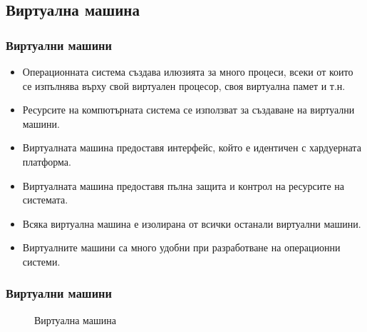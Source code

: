\documentclass[ignorenonframetext, hyperref=unicode]{beamer}
\begin{document}
\subsection{Виртуална машина}

\begin{frame}
\frametitle{Виртуални машини}
\begin{itemize}
\item Операционната система създава илюзията за много процеси, всеки от които се
изпълнява върху свой виртуален процесор, своя виртуална памет и т.н.
\item Ресурсите на компютърната система се използват за създаване на виртуални
машини.
\item Виртуалната машина предоставя интерфейс, който е идентичен с хардуерната
платформа. 
\item Виртуалната машина предоставя пълна защита и контрол на ресурсите на
системата.
\item Всяка виртуална машина е изолирана от всички останали виртуални машини.
\item Виртуалните машини са много удобни при разработване на операционни системи.
\end{itemize}
\end{frame}

\begin{frame}
\frametitle{Виртуални машини}
\begin{figure}[h]
\center
{}
\caption{Виртуална машина}
\end{figure}
\end{frame}
\end{document}
